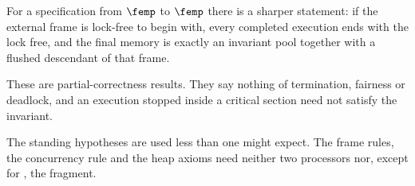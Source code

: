 For a specification from $\femp$ to $\femp$ there is a sharper statement: if the external frame is lock-free to begin with, every completed execution
ends with the lock free, and the final memory is exactly an invariant pool
together with a flushed descendant of that frame.

These are partial-correctness results. They say nothing of termination,
fairness or deadlock, and an execution stopped inside a critical section
need not satisfy the invariant.

The standing hypotheses are used less than one might expect. The frame
rules, the concurrency rule and the heap axioms need neither two processors
nor, except for , the fragment.

